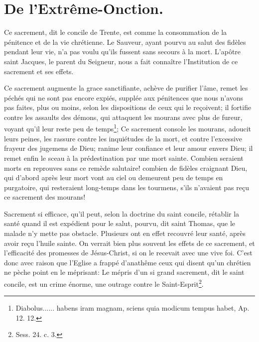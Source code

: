 \documentclass[instructions.tex]{subfiles}
\begin{document}
 
\chapter{De l'Extrême-Onction.}
 
Ce sacrement, dit le concile de Trente, est comme la consommation de la pénitence et de la vie chrétienne. Le Sauveur, ayant pourvu au salut des fidèles pendant leur vie, n'a pas voulu qu'ils fussent sans secours à la mort. L'apôtre saint Jacques, le parent du Seigneur, nous a fait connaître l'Institution de ce sacrement et ses effets.

\primo Ce sacrement augmente la grace sanctifiante, achève de purifier l'âme, remet les péchés qui ne sont pas encore expiés, supplée aux pénitences que nous n'avons pas faites, plus ou moins, selon les dispositions de ceux qui le reçoivent; il fortifie contre les assaults des démons, qui attaquent les mourans avec plus de fureur, voyant qu'il leur reste peu de temps\footnote{Diabolus...... habens iram magnam, sciens quia modicum tempus habet, Ap. 12. 12.}; Ce sacrement console les mourans, adoucit leurs peines, les rassure contre les inquiétudes de la mort, et contre l'excessive frayeur des jugemens de Dieu; ranime leur confiance et leur amour envers Dieu; il remet enfin le sceau à la prédestination par une mort sainte. Combien seraient morts en reprouves sans ce remède salutaire! combien de fidèles craignant Dieu, qui d'abord après leur mort vont au ciel ou demeurent peu de temps en purgatoire, qui resteraient long-temps dans les tourmens, s'ils n'avaient pas reçu ce sacrement des mourans!

Sacrement si efficace, qu'il peut, selon la doctrine du saint concile, rétablir la santé quand il est expédient pour le salut, pourvu, dit saint Thomas, que le malade n'y mette pas obstacle. Plusieurs ont en effet recouvré leur santé, après avoir reçu l'huile sainte. On verrait bien plus souvent les effets de ce sacrement, et l'efficacité des promesses de Jésus-Christ, si on le recevait avec une vive foi. C'est donc avec raison que l'Eglise a frappé d'anathême ceux qui disent qu'un chrétien ne pèche point en le méprisant: Le mépris d'un si grand sacrement, dit le saint concile, est un crime énorme, une outrage contre le Saint-Esprit\footnote{Sess. 24. c. 3.}.
\end{document}
